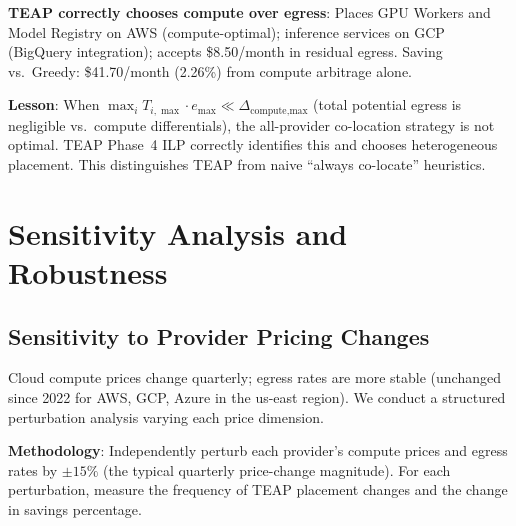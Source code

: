 \documentclass[10pt,journal]{IEEEtran}
\begin{document}
\textbf{TEAP correctly chooses compute over egress}: Places GPU Workers and
Model Registry on AWS (compute-optimal); inference services on GCP (BigQuery
integration); accepts \$8.50/month in residual egress.
Saving vs.\ Greedy: \$41.70/month (2.26\%) from compute arbitrage alone.

\textbf{Lesson}: When $\max_i T_{i,\max} \cdot e_{\max} \ll \Delta_{\text{compute,max}}$
(total potential egress is negligible vs.\ compute differentials), the all-provider
co-location strategy is not optimal.
TEAP Phase~4 ILP correctly identifies this and chooses heterogeneous placement.
This distinguishes TEAP from naive ``always co-locate'' heuristics.

\section{Sensitivity Analysis and Robustness}\label{sec:sensitivity}

\subsection{Sensitivity to Provider Pricing Changes}

Cloud compute prices change quarterly; egress rates are more stable (unchanged
since 2022 for AWS, GCP, Azure in the us-east region).
We conduct a structured perturbation analysis varying each price dimension.

\textbf{Methodology}: Independently perturb each provider's compute prices
and egress rates by $\pm15\%$ (the typical quarterly price-change magnitude).
For each perturbation, measure the frequency of TEAP placement changes and
the change in savings percentage.
\end{document}
